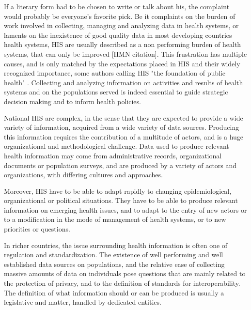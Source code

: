 If a literary form had to be chosen to write or talk about \gls*{his}, the complaint would probably be everyone's favorite pick. Be it complaints on the burden of work involved in collecting, managing and analyzing data in health systems, or laments on the inexistence of good quality data in most developing countries health systems, HIS are usually described as a non performing burden of health systems, that can only be improved [HMN citation]. This frustration has multiple causes, and is only matched by the expectations placed in HIS and their widely recognized importance, some authors calling HIS "the foundation of public health"\cite{abou-zahr_health_2005} . Collecting and analyzing information on activities and results of health systems and on the populations served is indeed essential to guide strategic decision making and to inform health policies.

National HIS are complex, in the sense that they are expected to provide a wide variety of information, acquired from a wide variety of data sources. Producing this information requires the contribution of a multitude of actors, and is a huge organizational and methodological challenge. Data used to produce relevant health information may come from administrative records, organizational documents or population surveys, and are produced by a variety of actors and organizations, with differing cultures and approaches.

Moreover, HIS have to be able to adapt rapidly to changing epidemiological, organizational or political situations. They have to be able to produce relevant information on emerging health issues, and to adapt to the entry of new actors or to a modification in the mode of management of health systems, or to new priorities or questions.


In richer countries, the issue surrounding health information is often one of regulation and standardization. The  existence of well performing and well established data sources on populations, and the relative ease of collecting massive amounts of data on individuals pose questions that are mainly related to the protection of privacy, and to the definition of standards for interoperability. The definition of what information should or can be produced is usually a legislative and matter, handled by dedicated entities.


